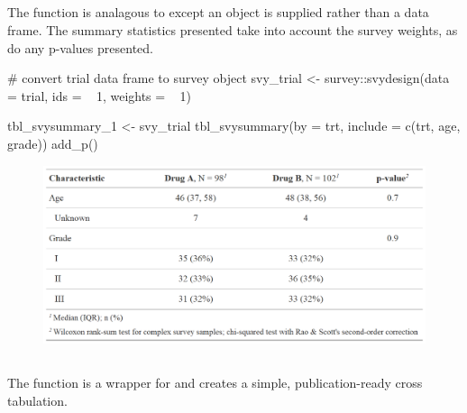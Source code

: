 \subsection{\texorpdfstring{}{tbl\_svysummary()}}

The  function is analagous to  except an  object is supplied rather than a data frame.
The summary statistics presented take into account the survey weights, as do any p-values presented.

\newpage
\begin{example}
# convert trial data frame to survey object
svy_trial <- survey::svydesign(data = trial, ids = ~ 1, weights = ~ 1)

tbl_svysummary_1 <-
  svy_trial %
  tbl_svysummary(by = trt, include = c(trt, age, grade)) %
  add_p()
\end{example}
\begin{figure}[h!]
  \includegraphics[scale=0.35]{svysummary.png}
  \centering
\end{figure}

\subsection{\texorpdfstring{}{tbl\_cross()}}

The  function is a wrapper for  and creates a simple, publication-ready cross tabulation.

